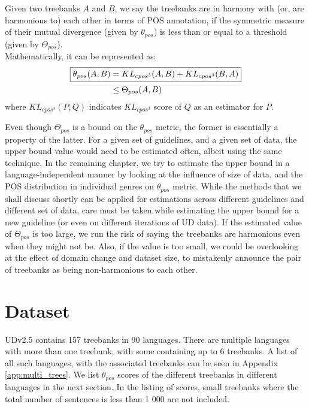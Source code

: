 \begin{definition}
\label{def:harmony}
Given two treebanks $A$ and $B$, we say the treebanks are in harmony with (or, are harmonious to) each other in terms of POS annotation, if the symmetric measure of their mutual divergence (given by $\theta_{pos}$) is less than or equal to a threshold (given by $\Theta_{pos}$). \\
    Mathematically, it can be represented as:
    \begin{align}
    \label{eq:pos_harmony}
        \Aboxed{\theta_{pos}(A, B) & = \nonumber KL_{cpos^3}(A,B) + KL_{cpos^3}(B,A)} \\
        &\leq \Theta_{pos}(A, B)
    \end{align}
    where $KL_{cpos^3}(P,Q)$ indicates $KL_{cpos^3}$ score of $Q$ as an estimator for $P$.
\end{definition}

Even though $\Theta_{pos}$ is a bound on the $\theta_{pos}$ metric, the former is essentially a property of the latter. For a given set of guidelines, and a given set of data, the upper bound value would need to be estimated often, albeit using the same technique. In the remaining chapter, we try to estimate the upper bound in a language-independent manner by looking at the influence of size of data, and the POS distribution in individual genres on $\theta_{pos}$ metric. While the methods that we shall discuss shortly can be applied for estimations across different guidelines and different set of data, care must be taken while estimating the upper bound for a new guideline (or even on different iterations of UD data). If the estimated value of $\Theta_{pos}$ is too large, we run the risk of saying the treebanks are harmonious even when they might not be. Also, if the value is too small, we could be overlooking at the effect of domain change and dataset size, to mistakenly announce the pair of treebanks as being non-harmonious to each other.

\section{Dataset}
\label{sec:pos-harmony-dataset}

UDv2.5 \citep{UDv2.5} contains 157 treebanks in 90 languages. There are multiple languages with more than one treebank, with some containing up to 6 treebanks. A list of all such languages, with the associated treebanks can be seen in Appendix \ref{app:multi_trees}. We list $\theta_{pos}$ scores of the different treebanks in different languages in the next section. In the listing of scores, small treebanks where the total number of sentences is less than 1 000 are not included.

